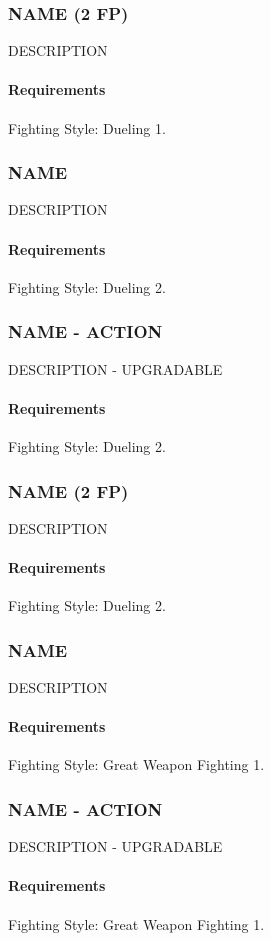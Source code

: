 \subsubsection{NAME (2 FP)} \label{feat::name}
    DESCRIPTION
    \paragraph{Requirements} Fighting Style: Dueling 1.
\subsubsection{NAME} \label{feat::name}
    DESCRIPTION
    \paragraph{Requirements} Fighting Style: Dueling 2.
\subsubsection{NAME - ACTION} \label{feat::name}
    DESCRIPTION - UPGRADABLE
    \paragraph{Requirements} Fighting Style: Dueling 2.
\subsubsection{NAME (2 FP)} \label{feat::name}
    DESCRIPTION
    \paragraph{Requirements} Fighting Style: Dueling 2.
\subsubsection{NAME} \label{feat::name}
    DESCRIPTION
    \paragraph{Requirements} Fighting Style: Great Weapon Fighting 1.
\subsubsection{NAME - ACTION} \label{feat::name}
    DESCRIPTION - UPGRADABLE
    \paragraph{Requirements} Fighting Style: Great Weapon Fighting 1.
